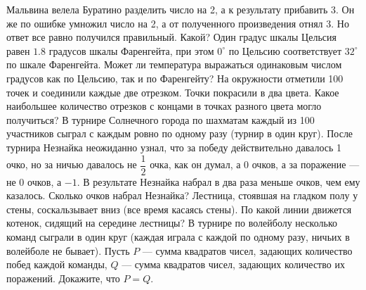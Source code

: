 \documentclass[a4paper,12pt]{article}
\begin{document}
    \iirules
    
    \problemw Мальвина велела Буратино разделить число на 2, а к результату прибавить 3. Он же по ошибке умножил число на 2, а от полученного произведения отнял 3. Но ответ все равно получился правильный. Какой?
    \problemw Один градус шкалы Цельсия равен $1.8$ градусов шкалы Фаренгейта, при этом $0^\circ$ по Цельсию соответствует $32^\circ$ по шкале Фаренгейта. Может ли температура выражаться одинаковым числом градусов как по Цельсию, так и по Фаренгейту? 
    \problem На окружности отметили 100 точек и соединили каждые две отрезком. Точки покрасили в два цвета. Какое наибольшее количество отрезков с концами в точках разного цвета могло получиться?
    \problemw В турнире Солнечного города по шахматам каждый из 100 участников сыграл с каждым ровно по одному разу (турнир в один круг). После турнира Незнайка неожиданно узнал, что за победу действительно давалось 1 очко, но за ничью давалось не $\dfrac{1}{2}$ очка, как он думал, а 0 очков, а за поражение --- не 0 очков, а $-1$. В результате Незнайка набрал в два раза меньше очков, чем ему казалось. Сколько очков набрал Незнайка?
    \problem Лестница, стоявшая на гладком полу у стены, соскальзывает вниз (все время касаясь стены). По какой линии движется котенок, сидящий на середине лестницы?
     В турнире по волейболу несколько команд сыграли в один круг (каждая играла с каждой по одному разу, ничьих в волейболе не бывает). Пусть $P$ --- сумма квадратов чисел, задающих количество побед каждой команды, $Q$ --- сумма квадратов чисел, задающих количество их поражений. Докажите, что $P = Q$.
\end{document}
